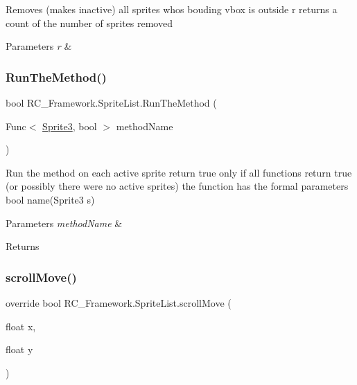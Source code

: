 Removes (makes inactive) all sprites whos bouding vbox is outside r returns a count of the number of sprites removed 


\begin{DoxyParams}{Parameters}
{\em r} & \\
\hline
\end{DoxyParams}
\mbox{\label{class_r_c___framework_1_1_sprite_list_ad3406b2aeba1b08f23f13a35454f63e3}} 
\subsubsection{\texorpdfstring{Run\+The\+Method()}{RunTheMethod()}}
{\footnotesize\ttfamily bool R\+C\+\_\+\+Framework.\+Sprite\+List.\+Run\+The\+Method (\begin{DoxyParamCaption}\item[{Func$<$ \mbox{\hyperlink{class_r_c___framework_1_1_sprite3}{Sprite3}}, bool $>$}]{method\+Name }\end{DoxyParamCaption})}



Run the method on each active sprite return true only if all functions return true (or possibly there were no active sprites) the function has the formal parameters bool name(\+Sprite3 s) 


\begin{DoxyParams}{Parameters}
{\em method\+Name} & \\
\hline
\end{DoxyParams}
\begin{DoxyReturn}{Returns}

\end{DoxyReturn}
\mbox{\label{class_r_c___framework_1_1_sprite_list_ac4dbeb822b300bdcbebeb20c15b7bc9a}} 
\subsubsection{\texorpdfstring{scroll\+Move()}{scrollMove()}}
{\footnotesize\ttfamily override bool R\+C\+\_\+\+Framework.\+Sprite\+List.\+scroll\+Move (\begin{DoxyParamCaption}\item[{float}]{x,  }\item[{float}]{y }\end{DoxyParamCaption})\hspace{0.3cm}{\ttfamily [virtual]}}



